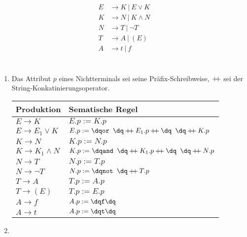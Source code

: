 \documentclass[a4paper,10pt]{scrartcl}
\begin{document}
\section{}
\begin{align*}
    E &\to K\ |\ E \lor K \\
    K &\to N\ |\ K \land N \\
    N &\to T\ |\ \neg T\\
    T &\to A\ |\ (E)\\
    A &\to t\ |\ f
\end{align*}

\section{}
\begin{enumerate}
 \item  Das Attribut $p$ eines Nichtterminals sei seine Präfix-Schreibweise, $\mathbin{+\mkern-5mu+}$ sei der String-Konkatinierungsoperator.
        \begin{center}
            \begin{tabular}{l|l}
                \textbf{Produktion} & \textbf{Sematische Regel} \\\hline
                $E \to K$                       & $E.p := K.p$ \\
                $E \to E_1 \lor K$              & $E.p := \str{or } \concat E_1.p \concat \str{ } \concat K.p$ \\
                $K \to N$                       & $K.p := N.p$ \\
                $K \to K_1 \land N$             & $K.p := \str{and } \concat K_1.p \concat \str{ } \concat N.p$\\
                $N \to T$                       & $N.p := T.p$\\
                $N \to \neg T$                  & $N.p := \str{not } \concat T.p$\\
                $T \to A$                       & $T.p := A.p$\\
                $T \to (E)$                     & $T.p := E.p$\\
                $A \to f$                       & $A.p := \str{f}$\\
                $A \to t$                       & $A.p := \str{t}$\\
            \end{tabular}
        \end{center}
 \item  \hspace{0cm}\\

\end{enumerate}
\end{document}
